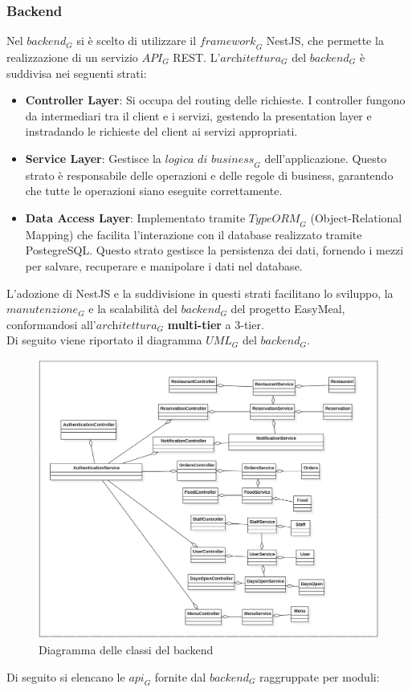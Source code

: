 \subsubsection{Backend}
Nel $\textit{backend}_G$ si è scelto di utilizzare il $\textit{framework}_G$ NestJS, che permette la realizzazione di un servizio $\textit{API}_G$ REST. L'$\textit{architettura}_G$ del $\textit{backend}_G$ è suddivisa nei seguenti strati:
\begin{itemize}
\item \textbf{Controller Layer}: Si occupa del routing delle richieste. I controller fungono da intermediari tra il client e i servizi, gestendo la presentation layer e instradando le richieste del client ai servizi appropriati.
\item \textbf{Service Layer}: Gestisce la $\textit{logica di business}_G$ dell'applicazione. Questo strato è responsabile delle operazioni e delle regole di business, garantendo che tutte le operazioni siano eseguite correttamente.
\item \textbf{Data Access Layer}: Implementato tramite $\textit{TypeORM}_G$ (Object-Relational Mapping) che facilita l'interazione con il database realizzato tramite PostegreSQL. Questo strato gestisce la persistenza dei dati, fornendo i mezzi per salvare, recuperare e manipolare i dati nel database.
\end{itemize}
L'adozione di NestJS e la suddivisione in questi strati facilitano lo sviluppo, la $\textit{manutenzione}_G$ e la scalabilità del $\textit{backend}_G$ del progetto EasyMeal, conformandosi all'$\textit{architettura}_G$ \textbf{multi-tier} a 3-tier.\\
\newline
Di seguito viene riportato il diagramma $\textit{UML}_G$ del $\textit{backend}_G$.
\begin{figure}[H]
    \centering
    \includegraphics[width=\linewidth]{images/backenduml.png}
    \caption{Diagramma delle classi del backend}
    \label{fig:schemaER}
\end{figure}
Di seguito si elencano le $\textit{api}_G$ fornite dal $\textit{backend}_G$ raggruppate per moduli:
